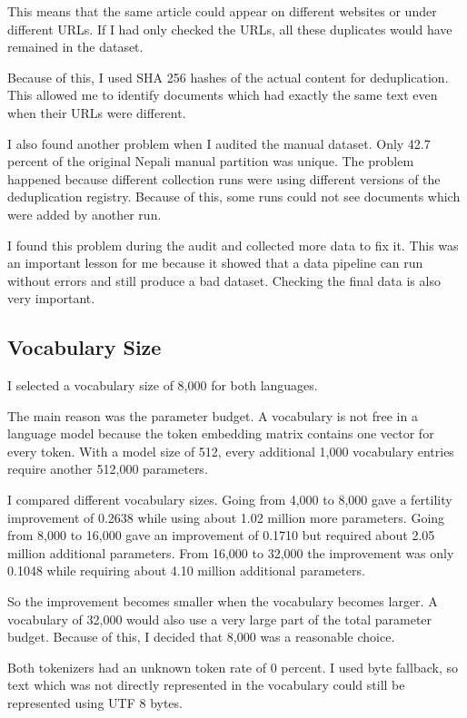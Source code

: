 \documentclass[twocolumn, 10pt]{article}
\begin{document}
This means that the same article could appear on different websites or under different URLs. If I had only checked the URLs, all these duplicates would have remained in the dataset.

Because of this, I used SHA 256 hashes of the actual content for deduplication. This allowed me to identify documents which had exactly the same text even when their URLs were different.

I also found another problem when I audited the manual dataset. Only 42.7 percent of the original Nepali manual partition was unique. The problem happened because different collection runs were using different versions of the deduplication registry. Because of this, some runs could not see documents which were added by another run.

I found this problem during the audit and collected more data to fix it. This was an important lesson for me because it showed that a data pipeline can run without errors and still produce a bad dataset. Checking the final data is also very important.

\subsection{Vocabulary Size}
I selected a vocabulary size of 8,000 for both languages.

The main reason was the parameter budget. A vocabulary is not free in a language model because the token embedding matrix contains one vector for every token. With a model size of 512, every additional 1,000 vocabulary entries require another 512,000 parameters.

I compared different vocabulary sizes. Going from 4,000 to 8,000 gave a fertility improvement of 0.2638 while using about 1.02 million more parameters. Going from 8,000 to 16,000 gave an improvement of 0.1710 but required about 2.05 million additional parameters. From 16,000 to 32,000 the improvement was only 0.1048 while requiring about 4.10 million additional parameters.

So the improvement becomes smaller when the vocabulary becomes larger. A vocabulary of 32,000 would also use a very large part of the total parameter budget. Because of this, I decided that 8,000 was a reasonable choice.

Both tokenizers had an unknown token rate of 0 percent. I used byte fallback, so text which was not directly represented in the vocabulary could still be represented using UTF 8 bytes.
\end{document}
